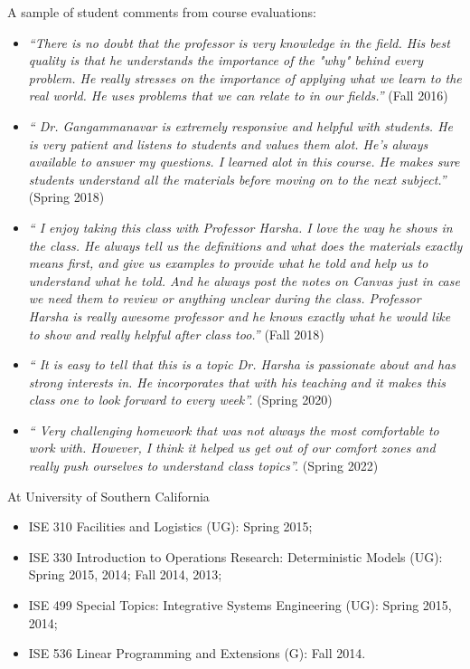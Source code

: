 \documentclass[hyperref, margin]{myResume}
\begin{document}
\begin{resume}
	A sample of student comments from course evaluations:
	\begin{itemize}[leftmargin=*]
		\item \emph{``There is no doubt that the professor is very knowledge in the field. His best quality is that he understands the importance of the "why" behind every problem. He really stresses on the importance of applying what we learn to the real world. He uses problems that we can relate to in our fields.''} (Fall 2016)
		\item \emph{`` Dr. Gangammanavar is extremely responsive and helpful with students. He is very patient and listens to students and values them alot. He’s always available to answer my questions. I learned alot in this course. He makes sure students understand all the materials before moving on to the next subject.''} (Spring 2018)
		\item \emph{`` I enjoy taking this class with Professor Harsha. I love the way he shows in the class. He always tell us the definitions and what does the materials exactly means first, and give us examples to provide what he told and help us to understand what he told. And he always post the notes on Canvas just in case we need them to review or anything unclear during the class. Professor Harsha is really awesome professor and he knows exactly what he would like to show and really helpful after class too.''} (Fall 2018)
		\item \emph{`` It is easy to tell that this is a topic Dr. Harsha is passionate about and has strong interests in. He incorporates that with his teaching and it makes this class one to look forward to every week''.} (Spring 2020)
		\item \emph{`` Very challenging homework that was not always the most comfortable to work with. However, I think it helped us get out of our comfort zones and really push ourselves to understand class topics''.} (Spring 2022)
	\end{itemize}
	\fi
	At University of Southern California
	\vspace{0.2cm}
	\begin{itemize}
		\item ISE 310 Facilities and Logistics (UG): Spring 2015;
		\item ISE 330 Introduction to Operations Research: Deterministic Models (UG): Spring 2015, 2014; Fall 2014, 2013;
		\item ISE 499 Special Topics: Integrative Systems Engineering (UG): Spring 2015, 2014;
		\item ISE 536 Linear Programming and Extensions (G): Fall 2014.
	\end{itemize}


\end{resume}
\end{document}
